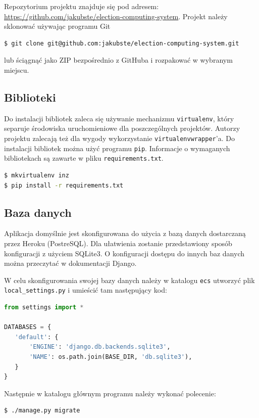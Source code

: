 \documentclass[pdflatex,11pt]{../aghdoc}
\begin{document}
Repozytorium projektu znajduje się pod adresem: \\ \url{https://github.com/jakubste/election-computing-system}.
Projekt należy sklonować używając programu Git 
\begin{lstlisting}[language=bash]
$ git clone git@github.com:jakubste/election-computing-system.git
\end{lstlisting}
lub ściągnąć jako ZIP bezpośrednio z GitHuba i rozpakować w wybranym miejscu.

\subsection{Biblioteki}
\label{subsec:biblioteki}

Do instalacji bibliotek zaleca się używanie mechanizmu \texttt{virtualenv}, który separuje środowiska uruchomieniowe dla poszczególnych projektów. Autorzy projektu zalecają też dla wygody wykorzystanie \texttt{virtualenvwrapper}'a. Do instalacji bibliotek można użyć programu \texttt{pip}.
Informacje o wymaganych bibliotekach są zawarte w pliku \texttt{requirements.txt}.
\begin{lstlisting}[language=bash]
$ mkvirtualenv inz
$ pip install -r requirements.txt
\end{lstlisting}

\subsection{Baza danych}
\label{subsec:database}

Aplikacja domyślnie jest skonfigurowana do użycia z bazą danych dostarczaną przez Heroku (PostreSQL). Dla ułatwienia zostanie przedstawiony sposób konfiguracji z użyciem SQLite3. O konfiguracji dostępu do innych baz danych można przeczytać w dokumentacji Django. 

W celu skonfigurowania swojej bazy danych należy w katalogu \texttt{ecs} utworzyć 
plik \texttt{local\_settings.py} i umieścić tam następujący kod:

\begin{lstlisting}[language=Python]
from settings import *

DATABASES = {
   'default': {
       'ENGINE': 'django.db.backends.sqlite3',
       'NAME': os.path.join(BASE_DIR, 'db.sqlite3'),
   }
}
\end{lstlisting}

Następnie w katalogu głównym programu należy wykonać polecenie:
\begin{lstlisting}[language=bash]
$ ./manage.py migrate
\end{lstlisting}
\end{document}
